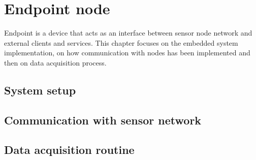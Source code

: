 \chapter{Endpoint node}
\label{chap:endpoint}

Endpoint is a device that acts as an interface between sensor node network and external clients and services. This chapter focuses on the embedded system implementation, on how communication with nodes has been implemented and then on data acquisition process.

\section{System setup}
\section{Communication with sensor network}
\section{Data acquisition routine}
